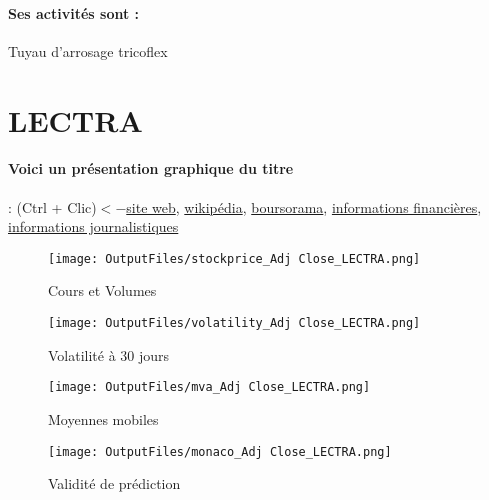\documentclass[11pt,a4paper]{report}%
\begin{document}
\paragraph{Ses activités sont : } Tuyau d’arrosage tricoflex 
    
    \newpage

\section{LECTRA}

\paragraph{Voici un présentation graphique du titre} : (Ctrl + Clic)$<-$\href{https://www.lectra.com/fr}{site web}, \href{https://fr.wikipedia.org/wiki/Lectra}{wikipédia}, \href{https://www.boursorama.com/cours/1rPLSS}{boursorama}, \href{https://www.qwant.com/?q=site:https:%2f%2fwww.easybourse.com%2faction-societe%2fLECTRA&t=web&client=ext-firefox-hp}{informations financières}, \href{https://bourse.lerevenu.com/cours-de-bourse/fiche-valeur-synthese/LECTRA/LSS-FR}{informations journalistiques}
\begin{figure}[!htb]
   \begin{minipage}{0.5\textwidth}
     \centering
     \texttt{[image: OutputFiles/stockprice\_Adj Close\_LECTRA.png]}
     \caption{Cours et Volumes}\label{Fig:price_LECTRA}
   \end{minipage}\hfill
   \begin{minipage}{0.5\textwidth}
     \centering
     \texttt{[image: OutputFiles/volatility\_Adj Close\_LECTRA.png]}
     \caption{Volatilité à 30 jours}\label{Fig:volat_LECTRA}
   \end{minipage}
\end{figure}
\begin{figure}[!htb]
   \begin{minipage}{0.5\textwidth}
     \centering
     \texttt{[image: OutputFiles/mva\_Adj Close\_LECTRA.png]}
     \caption{Moyennes mobiles}\label{Fig:mva_LECTRA}
   \end{minipage}\hfill
   \begin{minipage}{0.5\textwidth}
     \centering
     \texttt{[image: OutputFiles/monaco\_Adj Close\_LECTRA.png]}
     \caption{Validité de prédiction}\label{Fig:prediction_LECTRA}
   \end{minipage}
\end{figure}
\end{document}
